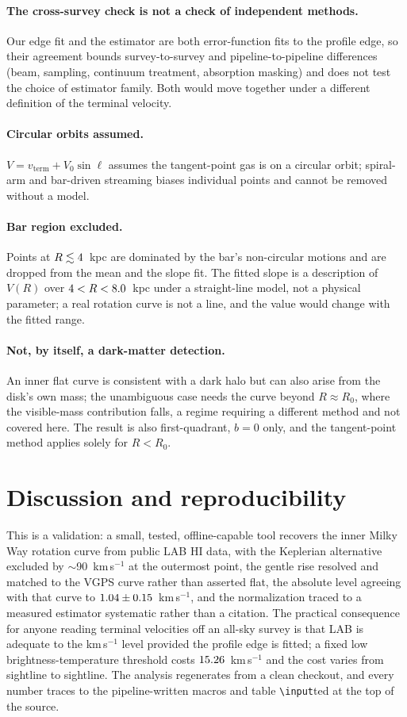 \documentclass[twocolumn]{aastex631}
\newcommand{\code}[1]{\texttt{#1}}
\begin{document}
\paragraph{The cross-survey check is not a check of independent methods.} Our edge fit and the
\citet{mccluregriffiths2016} estimator are both error-function fits to the profile edge, so their
agreement bounds survey-to-survey and pipeline-to-pipeline differences (beam, sampling,
continuum treatment, absorption masking) and does not test the choice of estimator family. Both
would move together under a different definition of the terminal velocity.
\paragraph{Circular orbits assumed.} $V = v_\mathrm{term} + V_0\sin\ell$ assumes the tangent-point gas
is on a circular orbit; spiral-arm and bar-driven streaming biases individual points and cannot be
removed without a model.
\paragraph{Bar region excluded.} Points at $R\lesssim4$~kpc are dominated by the bar's
non-circular motions and are dropped from the mean and the slope fit. The fitted slope is a
description of $V(R)$ over $4 < R < 8.0$~kpc under a straight-line model, not a
physical parameter; a real rotation curve is not a line, and the value would change with the fitted
range.
\paragraph{Not, by itself, a dark-matter detection.} An inner flat curve is consistent with a
dark halo but can also arise from the disk's own mass; the unambiguous case needs the curve beyond
$R\approx R_0$, where the visible-mass contribution falls, a regime requiring a different method
and not covered here. The result is also first-quadrant, $b=0$ only, and the tangent-point method
applies solely for $R<R_0$.

\section{Discussion and reproducibility}
This is a validation: a small, tested, offline-capable tool recovers the inner Milky Way rotation
curve from public LAB HI data, with the Keplerian alternative excluded by $\sim$90~km\,s$^{-1}$ at
the outermost point, the gentle rise resolved and matched to the VGPS curve rather than asserted
flat, the absolute level agreeing with that curve to
$1.04\pm0.15$~km\,s$^{-1}$, and the normalization traced to a
measured estimator systematic rather than a citation. The practical consequence for anyone reading
terminal velocities off an all-sky survey is that LAB is adequate to the km\,s$^{-1}$ level provided
the profile edge is fitted; a fixed low brightness-temperature threshold costs
$15.26$~km\,s$^{-1}$ and the cost varies from sightline to sightline. The analysis
regenerates from a clean checkout, and every number traces to the pipeline-written macros and
table \code{\textbackslash input}ted at the top of the source.
\end{document}
